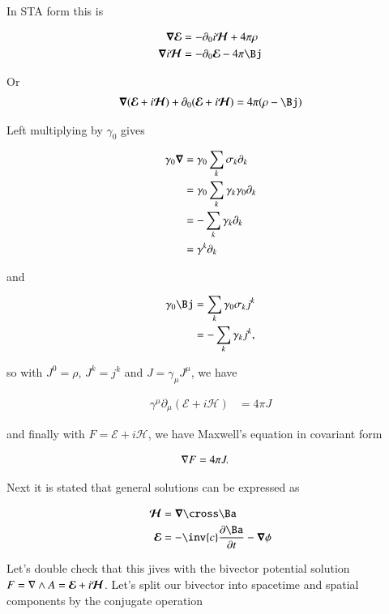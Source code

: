 \documentclass{article}
\newcommand{\EE}[0]{\boldsymbol{\mathcal{E}}}
\newcommand{\HH}[0]{\boldsymbol{\mathcal{H}}}
\begin{document}
In STA form this is

\begin{align*}
\spacegrad \EE &= - \partial_0 i\HH + 4 \pi \rho \\
\spacegrad i\HH &= -\partial_0 \EE - 4 \pi \Bj \\
\end{align*}

Or
\begin{align*}
\spacegrad (\EE + i\HH) + \partial_0 (\EE + i\HH) &= 4 \pi (\rho - \Bj) \\
\end{align*}

Left multiplying by $\gamma_0$ gives

\begin{align*}
\gamma_0 \boldsymbol{\nabla} 
&= \gamma_0 \sum_k \sigma_k \partial_k \\
&= \gamma_0 \sum_k \gamma_k \gamma_0 \partial_k \\
&= -\sum_k \gamma_k \partial_k \\
&= \gamma^k \partial_k \\
\end{align*}

and

\begin{align*}
\gamma_0 \Bj 
&= \sum_k \gamma_0 \sigma_k j^k \\
&= -\sum_k \gamma_k j^k,
\end{align*}

so with $J^0 = \rho$, $J^k = j^k$ and $J = \gamma_\mu J^\mu$, we have

\begin{align*}
\gamma^\mu \partial_\mu (\EE + i\HH) &= 4 \pi J
\end{align*}

and finally with $F = \EE + i\HH$, we have Maxwell's equation in covariant form

\begin{align*}
\nabla F &= 4 \pi J.
\end{align*}

Next it is stated that general solutions can be expressed as

\begin{align}\label{eqn:fieldsFromPotentials}
\HH &= \spacegrad \cross \Ba \\
\EE &= - \inv{c} \PD{t}{\Ba} - \spacegrad \phi
\end{align}

Let's double check that this jives with the bivector potential solution $F = \grad \wedge A = \EE + i\HH$.  Let's split our bivector
into spacetime and spatial components by the conjugate operation
\end{document}
